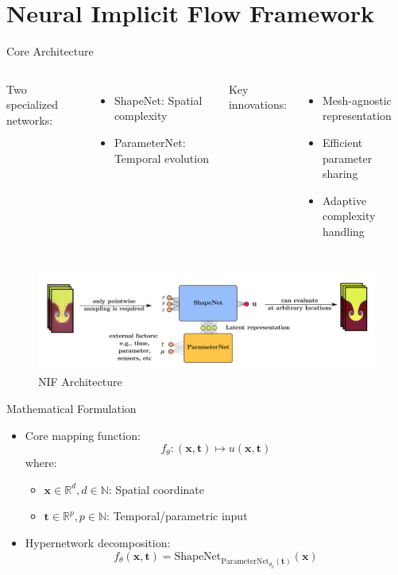 \documentclass{beamer}
\begin{document}
\section{Neural Implicit Flow Framework}
\begin{frame}{Core Architecture}
    \begin{columns}
        Two specialized networks:
        \begin{itemize}
            \item ShapeNet: Spatial complexity
            \item ParameterNet: Temporal evolution
        \end{itemize}

        Key innovations:
        \begin{itemize}
            \item Mesh-agnostic representation
            \item Efficient parameter sharing
            \item Adaptive complexity handling
        \end{itemize}        
    \end{columns}
    \begin{figure}
        \includegraphics[width=\textwidth]{../../20-minute-presentation/latex/hypernetwork_diagram}
        \caption{NIF Architecture}
    \end{figure}
\end{frame}

\begin{frame}{Mathematical Formulation}
    \begin{itemize}
        \item Core mapping function:
        \[ f_\theta: (\mathbf{x}, \mathbf{t}) \mapsto u(\mathbf{x}, \mathbf{t}) \]
        where:
        \begin{itemize}
            \item $\mathbf{x} \in \mathbb{R}^d, d \in \mathbb{N}$: Spatial coordinate
            \item $\mathbf{t} \in \mathbb{R}^p, p \in \mathbb{N}$: Temporal/parametric input
        \end{itemize}
        \item Hypernetwork decomposition:
        \[ f_\theta(\mathbf{x}, \mathbf{t}) = \text{ShapeNet}_{\text{ParameterNet}_{\theta_p}(\mathbf{t})}(\mathbf{x}) \]
    \end{itemize}
\end{frame}
\end{document}
